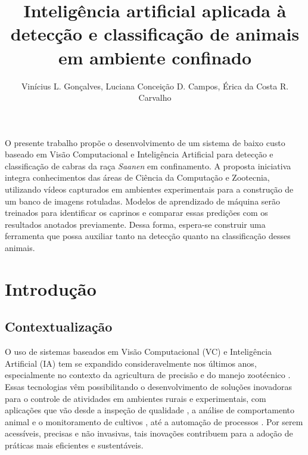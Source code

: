 \documentclass[12pt]{article}
\title{Inteligência artificial aplicada à detecção e classificação de animais em ambiente confinado}
\author{Vinícius L. Gonçalves\inst{1}, Luciana Conceição D. Campos\inst{1}, Érica da Costa R. Carvalho\inst{2} }
\begin{document}
 

\maketitle

     
\begin{resumo} 
  O presente trabalho propõe o desenvolvimento de um sistema de baixo custo baseado em Visão Computacional e Inteligência Artificial para detecção e classificação de cabras da raça \textit{Saanen} em confinamento. A proposta iniciativa integra conhecimentos das áreas de Ciência da Computação e Zootecnia, utilizando vídeos capturados em ambientes experimentais para a construção de um banco de imagens rotuladas. Modelos de aprendizado de máquina serão treinados para identificar os caprinos e comparar essas predições com os resultados anotados previamente. Dessa forma, espera-se construir uma ferramenta que possa auxiliar tanto na detecção quanto na classificação desses animais.
\end{resumo}


\section{Introdução}
\label{sec:introducao}

\subsection{Contextualização}
\label{subsec:contextualizacao}

O uso de sistemas baseados em Visão Computacional (VC) e Inteligência Artificial (IA) tem se expandido consideravelmente nos últimos anos, especialmente no contexto da agricultura de precisão e do manejo zootécnico \cite{kamilaris2018deep}. Essas tecnologias vêm possibilitando o desenvolvimento de soluções inovadoras para o controle de atividades em ambientes rurais e experimentais, com aplicações que vão desde a inspeção de qualidade \cite{industrial_quality_cv_2024}, a análise de comportamento animal \cite{animalformer_2024} e o monitoramento de cultivos \cite{vit_precision_agriculture_2025}, até a automação de processos \cite{kang2025bokchoy_cv_iot}. Por serem acessíveis, precisas e não invasivas, tais inovações contribuem para a adoção de práticas mais eficientes e sustentáveis.
\end{document}

